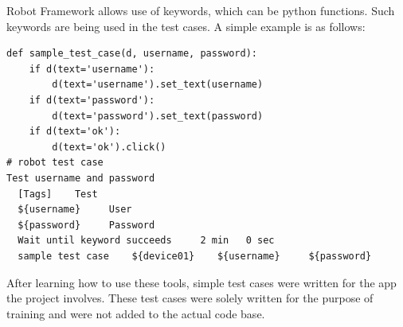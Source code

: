 Robot Framework allows use of keywords, which can be python functions. Such keywords are being used in the test cases. A simple example is as follows:

\begin{lstlisting}[style=PyStyle]
def sample_test_case(d, username, password):
	if d(text='username'):
		d(text='username').set_text(username)
	if d(text='password'):
		d(text='password').set_text(password)
	if d(text='ok'):
		d(text='ok').click()	
# robot test case
Test username and password
  [Tags]    Test
  ${username}     User
  ${password}     Password
  Wait until keyword succeeds     2 min   0 sec   
  sample test case    ${device01}    ${username}     ${password}
\end{lstlisting}
After learning how to use these tools, simple test cases were written for the app the project involves. These test cases were solely written for the purpose of training and were not added to the actual code base. 


